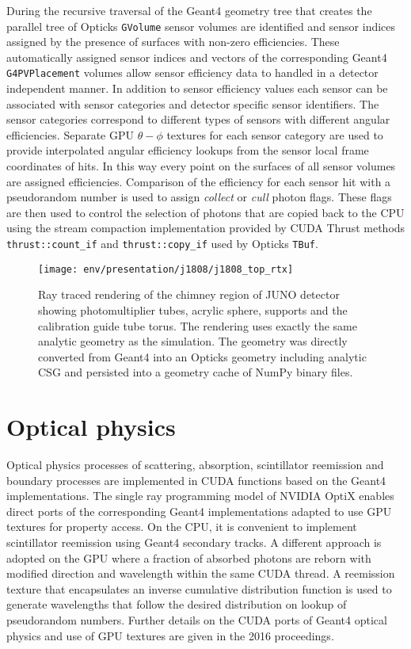 \documentclass{webofc}
\begin{document}
During the recursive traversal of the Geant4 geometry tree that creates the parallel tree of Opticks {\tt GVolume}
sensor volumes are identified and sensor indices assigned by the presence of surfaces with non-zero efficiencies. 
These automatically assigned sensor indices and vectors of the corresponding Geant4 {\tt G4PVPlacement} volumes 
allow sensor efficiency data to handled in a detector independent manner. In addition to sensor efficiency values 
each sensor can be associated with sensor categories and detector specific sensor identifiers. The sensor categories
correspond to different types of sensors with different angular efficiencies.  Separate GPU $\theta-\phi$ textures 
for each sensor category are used to provide interpolated angular efficiency lookups from the sensor local 
frame coordinates of hits. In this way every point on the surfaces of all sensor volumes are assigned efficiencies.
Comparison of the efficiency for each sensor hit with a pseudorandom number is used to assign {\it collect} or {\it cull} 
photon flags. These flags are then used to control the selection of photons that are copied back to the CPU 
using the stream compaction implementation provided by CUDA Thrust\cite{thrust} methods {\tt thrust::count\_if} and 
{\tt thrust::copy\_if} used by Opticks {\tt TBuf}. 
%       
%
%
\begin{figure}
\centering
\texttt{[image: env/presentation/j1808/j1808\_top\_rtx]}
\caption{Ray traced rendering of the chimney region of JUNO detector showing photomultiplier tubes, acrylic sphere, supports and the calibration guide tube torus. 
The rendering uses exactly the same analytic geometry as the simulation.
The geometry was directly converted from Geant4 into an Opticks geometry including analytic CSG 
and persisted into a geometry cache of NumPy\cite{numpy} binary files. 
}
\label{j1808} 
\end{figure}
%
%
\section{Optical physics}%
%
Optical physics processes of scattering, absorption, scintillator reemission and 
boundary processes are implemented in CUDA functions based on the Geant4
implementations. 
%
The single ray programming model of NVIDIA OptiX enables 
direct ports of the corresponding Geant4 implementations adapted
to use GPU textures for property access. 
%
On the CPU, it is convenient to implement scintillator reemission using Geant4 secondary 
tracks. A different approach is adopted on the GPU where a fraction of absorbed photons
are reborn with modified direction and wavelength within the same CUDA thread. 
A reemission texture that encapsulates an inverse cumulative distribution function 
is used to generate wavelengths that follow the desired distribution on lookup of pseudorandom numbers. 
%
Further details on the CUDA ports of Geant4 optical physics and use of GPU textures 
are given in the 2016 proceedings\cite{chep2016}.
%
%
%
\end{document}
